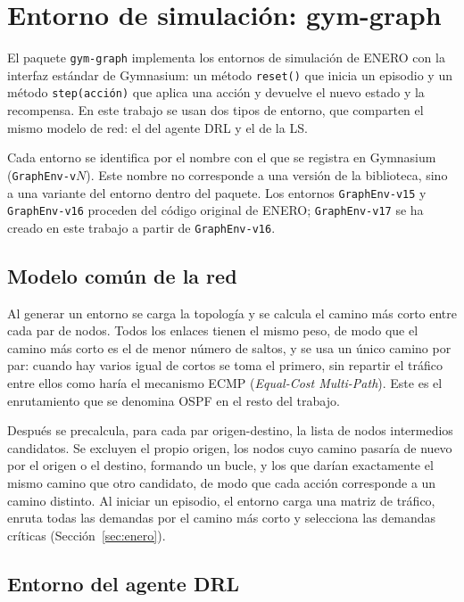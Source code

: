 \section{Entorno de simulación: gym-graph}\label{sec:gymgraph}

El paquete \texttt{gym-graph} implementa los entornos de simulación de ENERO con la interfaz estándar de Gymnasium: un método \texttt{reset()} que inicia un episodio y un método \texttt{step(acción)} que aplica una acción y devuelve el nuevo estado y la recompensa. En este trabajo se usan dos tipos de entorno, que comparten el mismo modelo de red: el del agente DRL y el de la LS.

Cada entorno se identifica por el nombre con el que se registra en Gymnasium (\texttt{GraphEnv-v}$N$). Este nombre no corresponde a una versión de la biblioteca, sino a una variante del entorno dentro del paquete. Los entornos \texttt{GraphEnv-v15} y \texttt{GraphEnv-v16} proceden del código original de ENERO; \texttt{GraphEnv-v17} se ha creado en este trabajo a partir de \texttt{GraphEnv-v16}.

\subsection{Modelo común de la red}

Al generar un entorno se carga la topología y se calcula el camino más corto entre cada par de nodos. Todos los enlaces tienen el mismo peso, de modo que el camino más corto es el de menor número de saltos, y se usa un único camino por par: cuando hay varios igual de cortos se toma el primero, sin repartir el tráfico entre ellos como haría el mecanismo ECMP (\textit{Equal-Cost Multi-Path}). Este es el enrutamiento que se denomina OSPF en el resto del trabajo.

Después se precalcula, para cada par origen-destino, la lista de nodos intermedios candidatos. Se excluyen el propio origen, los nodos cuyo camino pasaría de nuevo por el origen o el destino, formando un bucle, y los que darían exactamente el mismo camino que otro candidato, de modo que cada acción corresponde a un camino distinto. Al iniciar un episodio, el entorno carga una matriz de tráfico, enruta todas las demandas por el camino más corto y selecciona las demandas críticas (Sección~\ref{sec:enero}).

\subsection{Entorno del agente DRL}\label{sec:env17}

